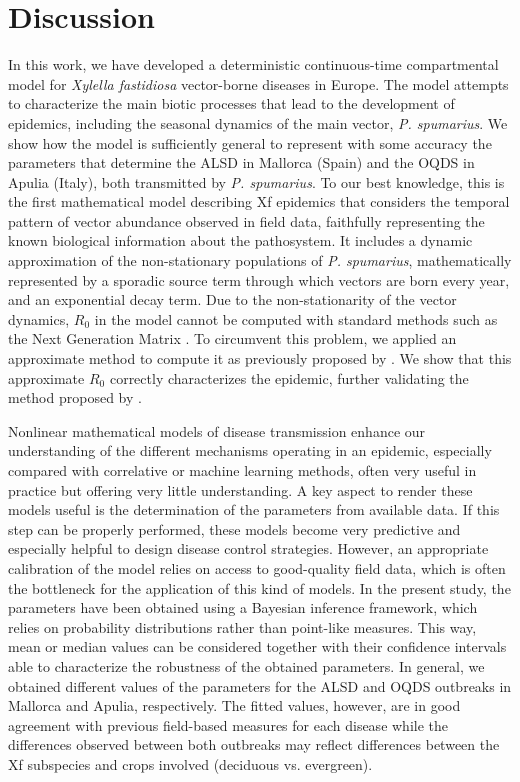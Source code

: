 \section{Discussion}

In this work, we have developed a deterministic continuous-time
compartmental model for \textit{Xylella fastidiosa} vector-borne diseases in
Europe. The model attempts to characterize the main biotic processes that lead
to the development of epidemics, including the seasonal dynamics of the main
vector, \textit{P. spumarius}. We show how the model is sufficiently general to
represent with some accuracy the parameters that determine the ALSD in Mallorca
(Spain) and the OQDS in Apulia (Italy), both transmitted by \textit{P.
    spumarius}. To our best knowledge, this is the first mathematical model
describing Xf epidemics that considers the temporal pattern of vector abundance
observed in field data, faithfully representing the known biological
information about the pathosystem. It includes a dynamic approximation of the
non-stationary populations of \textit{P. spumarius}, mathematically represented
by a sporadic source term through which vectors are born every year, and an
exponential decay term. Due to the non-stationarity of the vector dynamics,
$R_0$ in the model cannot be computed with standard methods such as the Next
Generation Matrix \cite{Diekmann2010}. To circumvent this problem, we applied
an approximate method to compute it as previously proposed by
\cite{GimenezRomero2022_PRE}. We show that this approximate $R_0$ correctly
characterizes the epidemic, further validating the method proposed by
\cite{GimenezRomero2022_PRE}.

Nonlinear mathematical models of disease transmission enhance our
understanding of the different mechanisms operating in an epidemic, especially
compared with correlative or machine learning methods, often very useful in
practice but offering very little understanding. A key aspect to render these
models useful is the determination of the parameters from available data. If
this step can be properly performed, these models become very predictive and
especially helpful to design disease control strategies. However, an
appropriate calibration of the model relies on access to good-quality field
data, which is often the bottleneck for the application of this kind of models.
In the present study, the parameters have been obtained using a Bayesian
inference framework, which relies on probability distributions rather than
point-like measures. This way, mean or median values can be considered together
with their confidence intervals able to characterize the robustness of the
obtained parameters. In general, we obtained different values of the parameters
for the ALSD and OQDS outbreaks in Mallorca and Apulia, respectively. The
fitted values, however, are in good agreement with previous field-based
measures for each disease while the differences observed between both outbreaks
may reflect differences between the Xf subspecies and crops involved (deciduous
vs. evergreen).

